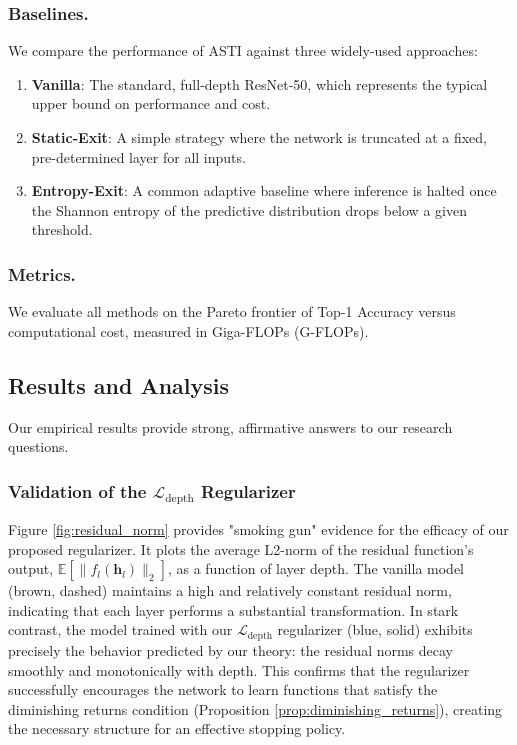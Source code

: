 \documentclass[12pt]{imsart}
\newcommand{\E}{\mathbb{E}}
\newcommand{\h}{\mathbf{h}}
\newcommand{\Ldepth}{\mathcal{L}_{\text{depth}}}
\theoremstyle{plain}
\theoremstyle{definition}
\begin{document}
\subsubsection{Baselines.}
We compare the performance of ASTI against three widely-used approaches:
\begin{enumerate}
    \item \textbf{Vanilla}: The standard, full-depth ResNet-50, which represents the typical upper bound on performance and cost.
    \item \textbf{Static-Exit}: A simple strategy where the network is truncated at a fixed, pre-determined layer for all inputs.
    \item \textbf{Entropy-Exit}: A common adaptive baseline where inference is halted once the Shannon entropy of the predictive distribution drops below a given threshold.
\end{enumerate}

\subsubsection{Metrics.}
We evaluate all methods on the Pareto frontier of Top-1 Accuracy versus computational cost, measured in Giga-FLOPs (G-FLOPs).

\subsection{Results and Analysis}
Our empirical results provide strong, affirmative answers to our research questions.

\subsubsection{Validation of the \texorpdfstring{$\Ldepth$}{L-depth} Regularizer}
Figure \ref{fig:residual_norm} provides "smoking gun" evidence for the efficacy of our proposed regularizer. It plots the average L2-norm of the residual function's output, $\E[\|f_l(\h_l)\|_2]$, as a function of layer depth. The vanilla model (brown, dashed) maintains a high and relatively constant residual norm, indicating that each layer performs a substantial transformation. In stark contrast, the model trained with our $\Ldepth$ regularizer (blue, solid) exhibits precisely the behavior predicted by our theory: the residual norms decay smoothly and monotonically with depth. This confirms that the regularizer successfully encourages the network to learn functions that satisfy the diminishing returns condition (Proposition \ref{prop:diminishing_returns}), creating the necessary structure for an effective stopping policy.
\end{document}
